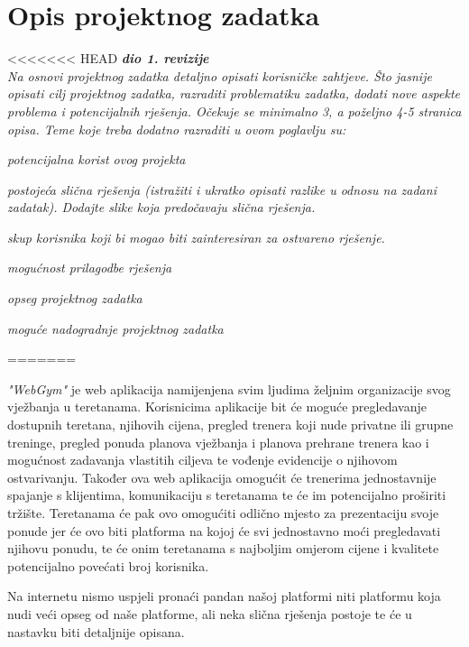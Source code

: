 \chapter{Opis projektnog zadatka}
		
<<<<<<< HEAD
		\textbf{\textit{dio 1. revizije}}\\
		
		\textit{Na osnovi projektnog zadatka detaljno opisati korisničke zahtjeve. Što jasnije opisati cilj projektnog zadatka, razraditi problematiku zadatka, dodati nove aspekte problema i potencijalnih rješenja. Očekuje se minimalno 3, a poželjno 4-5 stranica opisa.	Teme koje treba dodatno razraditi u ovom poglavlju su:}
		\begin{packed_item}
			\item \textit{potencijalna korist ovog projekta}
			\item \textit{postojeća slična rješenja (istražiti i ukratko opisati razlike u odnosu na zadani zadatak). Dodajte slike koja predočavaju slična rješenja.}
			\item \textit{skup korisnika koji bi mogao biti zainteresiran za ostvareno rješenje.}
			\item \textit{mogućnost prilagodbe rješenja }
			\item \textit{opseg projektnog zadatka}
			\item \textit{moguće nadogradnje projektnog zadatka}
		\end{packed_item}
		
=======
		
		\textit{"WebGym"} je web aplikacija namijenjena svim ljudima željnim organizacije 
		svog vježbanja u teretanama. Korisnicima aplikacije bit će moguće pregledavanje 
		dostupnih teretana, njihovih cijena, pregled trenera koji nude privatne ili grupne 
		treninge, pregled ponuda planova vježbanja i planova prehrane trenera kao i 
		mogućnost zadavanja vlastitih ciljeva te vođenje evidencije o njihovom ostvarivanju.
		Također ova web aplikacija omogućit će trenerima jednostavnije spajanje s klijentima,
		komunikaciju s teretanama te će im potencijalno proširiti tržište. Teretanama će pak 
		ovo omogućiti odlično mjesto za prezentaciju svoje ponude jer će ovo biti platforma 
		na kojoj će svi jednostavno moći pregledavati njihovu ponudu, te će onim teretanama 
		s najboljim omjerom cijene i kvalitete potencijalno povećati broj korisnika. 
		
		\vspace{5mm}
		
		Na internetu nismo uspjeli pronaći pandan našoj platformi niti platformu koja 
		nudi veći opseg od naše platforme, ali neka slična rješenja postoje te će u nastavku 
		biti detaljnije opisana. 
		
